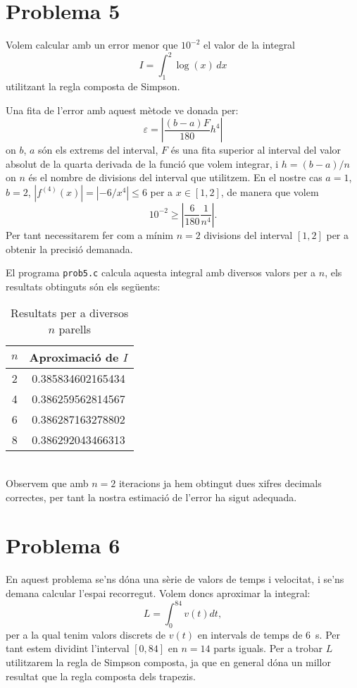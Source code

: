\documentclass[12pt]{article}
\numberwithin{table}{section}
\numberwithin{figure}{section}
\numberwithin{equation}{section}
\newcommand{\abs}[1]{\left\lvert #1 \right\rvert}
\begin{document}
\newpage
\section{Problema 5}
Volem calcular amb un error menor que $10^{-2}$ el valor de la integral
\begin{equation*}
	I = \int_{1}^{2}\log(x) \, dx
\end{equation*}
utilitzant la regla composta de Simpson.

Una fita de l'error amb aquest mètode ve donada per:
\begin{equation*}
	\varepsilon = \abs{\dfrac{(b-a)F}{180}h^4 } 
\end{equation*}
on $b$, $a$ són els extrems del interval, $F$ és una fita superior al interval del valor absolut de la quarta derivada de la funció que volem integrar, i $h=(b-a)/n$ on $n$ és el nombre de divisions del interval que utilitzem. En el nostre cas $a=1$, $b=2$, $|f^{(4)}(x)|=|-6/x^4|\leq6$ per a $x\in[1,2]$, de manera que volem
\begin{equation*}
	10^{-2} \geq \abs{\frac{6}{180} \dfrac{1}{n^4}}. 
\end{equation*}
Per tant necessitarem fer com a mínim $n=2$ divisions del interval $[1,2]$ per a obtenir la precisió demanada.

El programa \texttt{prob5.c} calcula aquesta integral amb diversos valors per a $n$, els resultats obtinguts són els següents:
\begin{table}[htb]
	\centering
	\caption{Resultats per a diversos $n$ parells}	
	\begin{tabular}{cS[table-parse-only]}
		\toprule
		{ \( n \) } & {Aproximació de \( I \) } \\
		 & 0.385834602165434 \\
		4 & 0.386259562814567 \\
		6 & 0.386287163278802 \\
		8 & 0.386292043466313 \\
	\end{tabular}
\end{table}\\
Observem que amb $n=2$ iteracions ja hem obtingut dues xifres decimals correctes, per tant la nostra estimació de l'error ha sigut adequada.

\newpage

\section{Problema 6}
En aquest problema se'ns dóna una sèrie de valors de temps i velocitat, i se'ns demana calcular l'espai recorregut. Volem doncs aproximar la integral:
\begin{equation*}
	L=\int_{0}^{84}v(t)dt,
\end{equation*}
per a la qual tenim valors discrets de $v(t)$ en intervals de temps de \SI{6}{s}. Per tant estem dividint l'interval $[0,84]$ en $n=14$ parts iguals. Per a trobar $L$ utilitzarem la regla de Simpson composta, ja que en general dóna un millor resultat que la regla composta dels trapezis. 
\end{document}
